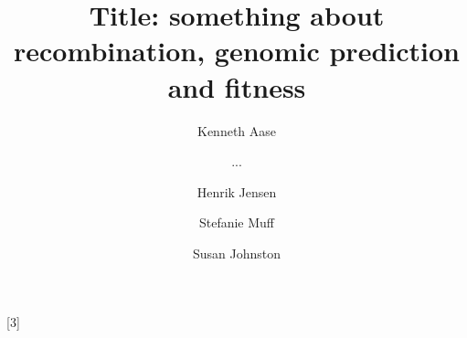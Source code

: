 \usepackage[utf8]{inputenc}
\usepackage[english]{babel}
\usepackage[doublespacing]{setspace}
\usepackage[mathlines]{lineno}
\usepackage{minted}
\usepackage{numprint}
\usepackage{csquotes,xpatch}
\usepackage{fancyhdr,lipsum}
\usepackage{amsmath}
\usepackage{amsfonts}
\usepackage[normalem]{ulem}
\usepackage[color=blue!30!white,textsize=small,textwidth=30mm]{todonotes}
\usepackage[left=2cm,top=2cm,right=3.5cm,bottom=2cm,bindingoffset=0.5cm]{geometry}
\usepackage{bm}
{}

\usepackage{tabularray}
\usepackage{codehigh}
\newcommand{\tinytableTabularrayUnderline}[1]{\underline{#1}}
\newcommand{\tinytableTabularrayStrikeout}[1]{\sout{#1}}
\NewTableCommand{\tinytableDefineColor}[3]{}



\usepackage{authblk}
\title{Title: something about recombination, genomic prediction and fitness}
\author[1,2,*]{Kenneth Aase}
\author[...]{...}
\author[2,3]{Henrik Jensen}
\author[1,2]{Stefanie Muff}
\author[4]{Susan Johnston}
\date{}

\renewcommand\rightmark{Short Title here}

\usepackage{natbib}
\newcommand*{\citef}[1]{\footnote{\cite{#1}}}

%

\newcommand{\E}{\mathsf{E}}
\newcommand{\Prob}{\mathsf{P}}
\newcommand{\Var}{\mathsf{Var}}
\newcommand{\Cov}{\mathsf{Cov}}
\newcommand{\Corr}{\mathsf{Corr}}
\newcommand\given[1][]{\:#1\vert\:}
\newcommand{\N}[2]{\mathsf{N}\left(#1, #2\right)}
\newcommand*\diff{\mathop{}\!\mathrm{d}}
\newcommand{\ie}{\emph{i.e.}}
\newcommand{\eg}{\emph{e.g.}}
\newcommand{\Ie}{\emph{I.e.}}
\newcommand{\Eg}{\emph{E.g.}}
\newcommand{\note}[1]{\textcolor{red}{\scriptsize #1}}
\newcommand{\hl}{\textcolor{blue}}

